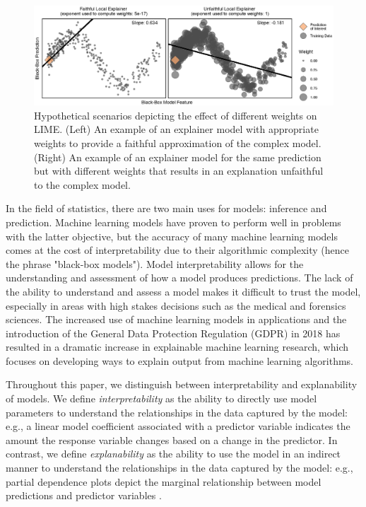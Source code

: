 \documentclass[AMS,STIX2COL]{WileyNJD-v2}\usepackage[]{graphicx}\usepackage[]{color}
\newenvironment{knitrout}{}{} %
\begin{document}
\begin{figure}[!thp]
\begin{knitrout}
\color{fgcolor}

{\centering \includegraphics[width=6.5in]{figure-01-1} 

}



\end{knitrout}
\caption{Hypothetical scenarios depicting the effect of different weights on LIME. (Left) An example of an explainer model with appropriate weights to provide a faithful approximation of the complex model. (Right) An example of an explainer model for the same prediction but with different weights that results in an explanation unfaithful to the complex model.}
\label{fig:figure-01}
\end{figure}

In the field of statistics, there are two main uses for models: inference and prediction. Machine learning models have proven to perform well in problems with the latter objective, but the accuracy of many machine learning models comes at the cost of interpretability due to their algorithmic complexity (hence the phrase "black-box models"). Model interpretability allows for the understanding and assessment of how a model produces predictions. The lack of the ability to understand and assess a model makes it difficult to trust the model, especially in areas with high stakes decisions such as the medical and forensics sciences. The increased use of machine learning models in applications and the introduction of the General Data Protection Regulation (GDPR) in 2018 \citep{goodman:2016} has resulted in a dramatic increase in explainable machine learning research, which focuses on developing ways to explain output from machine learning algorithms.

Throughout this paper, we distinguish between interpretability and explanability of models. We define {\it interpretability} as the ability to directly use model parameters to understand the relationships in the data captured by the model: e.g., a linear model coefficient associated with a predictor variable indicates the amount the response variable changes based on a change in the predictor. In contrast, we define {\it explanability} as the ability to use the model in an indirect manner to understand the relationships in the data captured by the model: e.g., partial dependence plots depict the marginal relationship between model predictions and predictor variables \citep{friedman:2001}.
\end{document}
